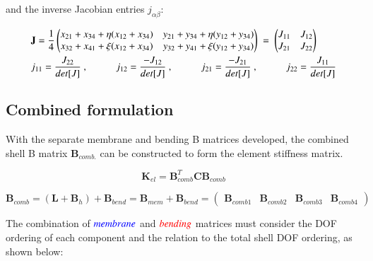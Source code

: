 and the inverse Jacobian entries $j_{\alpha \beta}$:

\begin{gather} 
	\begin{aligned}
		&\mathbf{J} = \frac{1}{4}
		\begin{pmatrix}
			x_{21} + x_{34} + \eta (x_{12} + x_{34}) & y_{21} + y_{34} + \eta (y_{12} + y_{34}) \\
			x_{32} + x_{41} + \xi (x_{12} + x_{34}) & y_{32} + y_{41} + \xi (y_{12} + y_{34})
		\end{pmatrix}
		\ = \ 
		\begin{pmatrix}
			J_{11} & J_{12} \\
			J_{21} & J_{22}
		\end{pmatrix} \\
		&j_{11} = \frac{J_{22}}{det[J]}\ ,
		\hspace{10mm}
		j_{12} = \frac{-J_{12}}{det[J]}\ ,
		\hspace{10mm}
		j_{21} = \frac{-J_{21}}{det[J]}\ ,
		\hspace{10mm}
		j_{22} = \frac{J_{11}}{det[J]}
		\label{equation29}
	\end{aligned}
\end{gather}

\subsection{Combined formulation}

With the separate membrane and bending B matrices developed, the combined shell B matrix $\textbf{B}_{comb.}$ can be constructed to form the element stiffness matrix.

\begin{equation} 
\textbf{K}_{el} = \textbf{B}_{comb}^T \textbf{C} \textbf{B}_{comb} 
\label{equation30}
\end{equation}

\begin{equation} 
\textbf{B}_{comb} = (\mathbf{L} + \mathbf{B}_h) + \mathbf{B}_{bend} = \mathbf{B}_{mem} + \mathbf{B}_{bend} = 
\begin{pmatrix}
\mathbf{B}_{comb1} & \mathbf{B}_{comb2} & \mathbf{B}_{comb3} & \mathbf{B}_{comb4}
\end{pmatrix}
\label{equation31}
\end{equation}

The combination of $\textcolor{blue}{membrane}$ and $\textcolor{red}{bending}$ matrices must consider the DOF ordering of each component and the relation to the total shell DOF ordering, as shown below:


